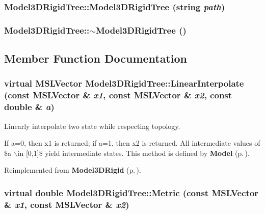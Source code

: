 \subsubsection{\setlength{\rightskip}{0pt plus 5cm}Model3DRigid\-Tree::Model3DRigid\-Tree (string {\em path})}\label{class_Model3DRigidTree_a0}


\subsubsection{\setlength{\rightskip}{0pt plus 5cm}Model3DRigid\-Tree::$\sim$Model3DRigid\-Tree ()\hspace{0.3cm}{\tt  [inline, virtual]}}\label{class_Model3DRigidTree_a1}




\subsection{Member Function Documentation}
\subsubsection{\setlength{\rightskip}{0pt plus 5cm}virtual {\bf MSLVector} Model3DRigid\-Tree::Linear\-Interpolate (const {\bf MSLVector} \& {\em x1}, const {\bf MSLVector} \& {\em x2}, const double \& {\em a})\hspace{0.3cm}{\tt  [virtual]}}\label{class_Model3DRigidTree_a4}


Linearly interpolate two state while respecting topology.

If a=0, then x1 is returned; if a=1, then x2 is returned. All intermediate values of \$a $\backslash$in [0,1]\$ yield intermediate states. This method is defined by {\bf Model} {\rm (p.\,\pageref{class_Model})}. 

Reimplemented from {\bf Model3DRigid} {\rm (p.\,\pageref{class_Model3DRigid_a5})}.
\subsubsection{\setlength{\rightskip}{0pt plus 5cm}virtual double Model3DRigid\-Tree::Metric (const {\bf MSLVector} \& {\em x1}, const {\bf MSLVector} \& {\em x2})\hspace{0.3cm}{\tt  [virtual]}}\label{class_Model3DRigidTree_a5}


